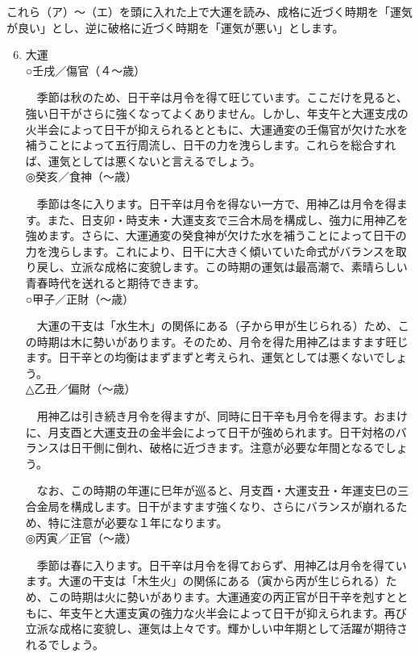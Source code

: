 \documentclass[a5paper,11pt,dvipdfmx]{tarticle}
\begin{document}
これら（ア）〜（エ）を頭に入れた上で大運を読み、成格に近づく時期を「運気が良い」とし、逆に破格に近づく時期を「運気が悪い」とします。

\begin{enumerate}
\setcounter{enumi}{5}
\item 大運\\
○壬戌／傷官（４〜歳）
  
　季節は秋のため、日干辛は月令を得て旺じています。ここだけを見ると、強い日干がさらに強くなってよくありません。しかし、年支午と大運支戌の火半会によって日干が抑えられるとともに、大運通変の壬傷官が欠けた水を補うことによって五行周流し、日干の力を洩らします。これらを総合すれば、運気としては悪くないと言えるでしょう。\\

◎癸亥／食神（〜歳）

　季節は冬に入ります。日干辛は月令を得ない一方で、用神乙は月令を得ます。また、日支卯・時支未・大運支亥で三合木局を構成し、強力に用神乙を強めます。さらに、大運通変の癸食神が欠けた水を補うことによって日干の力を洩らします。これにより、日干に大きく傾いていた命式がバランスを取り戻し、立派な成格に変貌します。この時期の運気は最高潮で、素晴らしい青春時代を送れると期待できます。\\

○甲子／正財（〜歳）

　大運の干支は「水生木」の関係にある（子から甲が生じられる）ため、この時期は木に勢いがあります。そのため、月令を得た用神乙はますます旺じます。日干辛との均衡はまずまずと考えられ、運気としては悪くないでしょう。\\

△乙丑／偏財（〜歳）

　用神乙は引き続き月令を得ますが、同時に日干辛も月令を得ます。おまけに、月支酉と大運支丑の金半会によって日干が強められます。日干対格のバランスは日干側に倒れ、破格に近づきます。注意が必要な年間となるでしょう。

　なお、この時期の年運に巳年が巡ると、月支酉・大運支丑・年運支巳の三合金局を構成します。日干がますます強くなり、さらにバランスが崩れるため、特に注意が必要な１年になります。\\

◎丙寅／正官（〜歳）

　季節は春に入ります。日干辛は月令を得ておらず、用神乙は月令を得ています。大運の干支は「木生火」の関係にある（寅から丙が生じられる）ため、この時期は火に勢いがあります。大運通変の丙正官が日干辛を剋すとともに、年支午と大運支寅の強力な火半会によって日干が抑えられます。再び立派な成格に変貌し、運気は上々です。輝かしい中年期として活躍が期待されるでしょう。


\end{enumerate}
\end{document}
